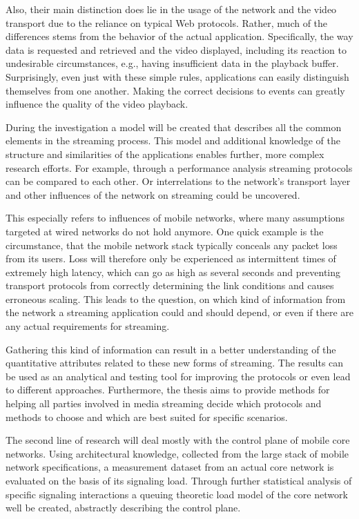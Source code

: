 Also, their main distinction does lie in the usage of the network and the video transport due to the reliance on typical Web protocols. Rather, much of the differences stems from the behavior of the actual application. Specifically, the way data is requested and retrieved and the video displayed, including its reaction to undesirable circumstances, e.g., having insufficient data in the playback buffer. Surprisingly, even just with these simple rules, applications can easily distinguish themselves from one another. Making the correct decisions to events can greatly influence the quality of the video playback. 

During the investigation a model will be created that describes all the common elements in the streaming process. This model and additional knowledge of the structure and similarities of the applications enables further, more complex research efforts. For example, through a performance analysis streaming protocols can be compared to each other. Or interrelations to the network's transport layer and other influences of the network on streaming could be uncovered. 

This especially refers to influences of mobile networks, where many assumptions targeted at wired networks do not hold anymore. One quick example is the circumstance, that the mobile network stack typically conceals any packet loss from its users. Loss will therefore only be experienced as  intermittent times of extremely high latency, which can go as high as several seconds and preventing transport protocols from correctly determining the link conditions and causes erroneous scaling.
This leads to the question, on which kind of information from the network a streaming application could and should depend, or even if there are any actual requirements for streaming.

Gathering this kind of information can result in a better understanding of the quantitative attributes related to these new forms of streaming. The results can be used as an analytical and testing tool for improving the protocols or even lead to different approaches. Furthermore, the thesis aims to provide methods for helping all parties involved in media streaming decide which protocols and methods to choose and which are best suited for specific scenarios.


The second line of research will deal mostly with the control plane of mobile core networks. Using architectural knowledge, collected from the large stack of mobile network specifications, a measurement dataset from an actual core network is evaluated on the basis of its signaling load. Through further statistical analysis of specific signaling interactions a queuing theoretic load model of the core network well be created, abstractly describing the control plane. 

